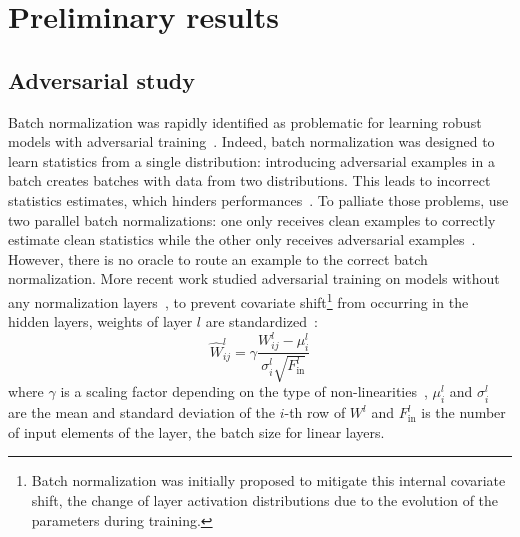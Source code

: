 \documentclass[../main.tex]{subfiles}
\begin{document}
\section{Preliminary results}
	\subsection{Adversarial study}
		Batch normalization was rapidly identified as problematic for learning robust models with adversarial training~\cite{AdvBNProblems,xie2019intriguingpropertiesadversarialtraining}.
		Indeed, batch normalization was designed to learn statistics from a single distribution: introducing adversarial examples in a batch creates batches with data from two distributions.
		This leads to incorrect statistics estimates, which hinders performances~\cite{AdvBNProblems,BNAdvStats}.
		To palliate those problems, \citeauthor{AdvBNProblems} use two parallel batch normalizations: one only receives clean examples to correctly estimate clean statistics while the other only receives adversarial examples~\cite{AdvBNProblems}.
		However, there is no oracle to route an example to the correct batch normalization.
		More recent work studied adversarial training on models without any normalization layers~\cite{wang2022removing}, to prevent covariate shift\footnote{Batch normalization was initially proposed to mitigate this internal covariate shift, the change of layer activation distributions due to the evolution of the parameters during training.} from occurring in the hidden layers, weights of layer \(l\) are standardized~\cite{brock2021characterizing}:
		\begin{equation}
			\hat{W}^{l}_{ij} = \gamma\frac{W^{l}_{ij} - \mu^{l}_{i}}{\sigma^{l}_{i}\sqrt{F^{l}_{\text{in}}}}
		\end{equation}
		where \(\gamma\) is a scaling factor depending on the type of non-linearities~\cite{brock2021characterizing}, \(\mu^{l}_{i}\) and \(\sigma^{l}_{i}\) are the mean and standard deviation of  the \(i\)-th row of \(W^{l}\) and \(F^{l}_{\text{in}}\) is the number of input elements of the layer, \ie{}the batch size for linear layers.
\end{document}
